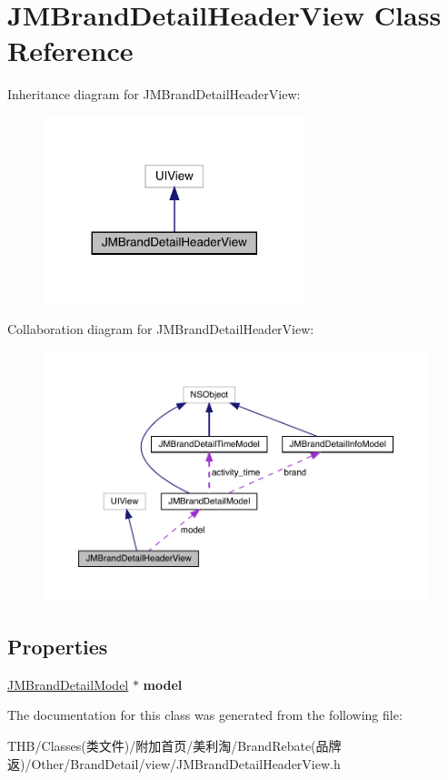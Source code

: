 \hypertarget{interface_j_m_brand_detail_header_view}{}\section{J\+M\+Brand\+Detail\+Header\+View Class Reference}
\label{interface_j_m_brand_detail_header_view}


Inheritance diagram for J\+M\+Brand\+Detail\+Header\+View\+:\nopagebreak
\begin{figure}[H]
\begin{center}
\leavevmode
\includegraphics[width=216pt]{interface_j_m_brand_detail_header_view__inherit__graph}
\end{center}
\end{figure}


Collaboration diagram for J\+M\+Brand\+Detail\+Header\+View\+:\nopagebreak
\begin{figure}[H]
\begin{center}
\leavevmode
\includegraphics[width=350pt]{interface_j_m_brand_detail_header_view__coll__graph}
\end{center}
\end{figure}
\subsection*{Properties}
\begin{DoxyCompactItemize}
\item 
\mbox{\label{interface_j_m_brand_detail_header_view_a813aca2bce289e13512154b56ffd5e2d}} 
\mbox{\hyperlink{interface_j_m_brand_detail_model}{J\+M\+Brand\+Detail\+Model}} $\ast$ {\bfseries model}
\end{DoxyCompactItemize}


The documentation for this class was generated from the following file\+:\begin{DoxyCompactItemize}
\item 
T\+H\+B/\+Classes(类文件)/附加首页/美利淘/\+Brand\+Rebate(品牌返)/\+Other/\+Brand\+Detail/view/J\+M\+Brand\+Detail\+Header\+View.\+h\end{DoxyCompactItemize}
